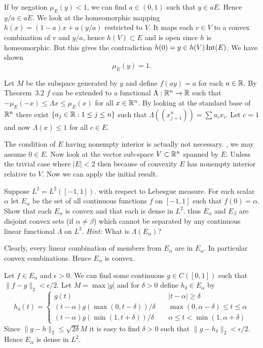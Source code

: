 \begin{enumerate}
If by negation \(\mu_E(y) < 1\), we can find \(a \in(0,1)\) such that
\(y\in aE\). Hence \(y/a \in aE\).
We look at the homeomorphic mapping
\(h(x) = (1-a)x+a(y/a)\)
restricted to $V$.
It maps each \(v\in V\) to a convex combination of $v$ and \(y/a\),
hence \(h(V) \subset E\) and is open since $h$ is homeomorphic.
But this gives the contradiction \(h(0) = y \in h(V) \mathop{\rm Int}\nolimits(E)\).
We have shown
\begin{equation*}
\mu_E(y) = 1.
\end{equation*}

Let $M$ be the subspace generated by $y$ and define
\(f(ay) = a\) for each \(a\in\mathbb{R}\).
By Theorem~3.2 $f$ can be extended to a functional \(\Lambda:\mathbb{R}^n\to\mathbb{R}\)
such that \(-\mu_E(-x) \leq \Lambda x \leq \mu_E(x)\) for all \(x\in\mathbb{R}^n\).
By looking at the standard base of \(\mathbb{R}^n\)
there exist \(\{a_j\in\mathbb{R}: 1\leq j \leq n\}\) such that
\(\Lambda((x_{j=1}^n)) = \sum a_ix_i\). Let \(c=1\)
and now \(\Lambda(x) \leq 1\) for all \(c\in E\).


The condition of $E$ having nonempty interior is actually not necessary.
\Wlogy, we may assume \(0\in E\).
Now look at the vector sub-space \(V\subset\mathbb{R}^n\) spanned by $E$.
Unless the trivial case where \(|E|<2\) then because of convexity
$E$ has nonempty interior relative to $V$.
Now we can apply the initial result.

\begin{excopy}
Suppose \(L^2=L^2([-1,1])\). with respect to Lebesgue measure.
For each scalar \(\alpha\) let \(E_\alpha\) be the set of all continuous
functions $f$ on \([-1,1]\) such that \(f(0)=\alpha\).
Show that each \(E_\alpha\) is convex and that each is dense in \(L^2\).
thus \(E_\alpha\) and \(E_\beta\) are disjoint convex sets
(if \(\alpha \neq \beta\)) which cannot be separated by any continuous linear
functional \(\Lambda\) on \(L^2\). \emph{Hint:} What is \(\Lambda(E_\alpha)\)?
\end{excopy}

Clearly, every linear combination of
members from \(E_\alpha\) are in \(E_\alpha\).
In particular convex combinations. Hence \(E_\alpha\) is convex.

Let \(f\in E_\alpha\) and \(\epsilon>0\).
We can find some continuous \(g\in C([0,1])\)
such that \(\|f-g\|_2<\epsilon/2\).
Let \(M = \max|g|\) and for \(\delta>0\) define \(h_\delta\in E_\alpha\) by
\begin{equation*}
h_\delta(t) = \left\{\begin{array}{ll}
 g(t) \quad & |t-\alpha|\geq\delta \\
 (t-\alpha)g(\max(0,t-\delta))/\delta \quad &
     \max(0,\alpha-\delta) \leq t \leq \alpha \\
 (t-\alpha)g(\min(1,t+\delta))/\delta \quad &
     \alpha \leq t < \min(1,\alpha+\delta)
     \end{array}\right.
\end{equation*}
Since \(\|g-h\|_2 \leq \sqrt{2\delta} M\)
it is easy to find \(\delta>0\) such that \(\|g-h_\delta\|_2 < \epsilon/2\).
Hence \(E_\alpha\) is dense in \(L^2\).


\end{enumerate}
